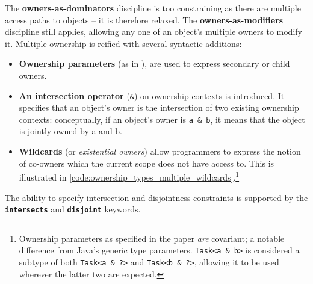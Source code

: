 \documentclass{acm_proc_article-sp}
\begin{document}
The \textbf{owners-as-dominators} discipline is too constraining as there are
multiple access paths to objects -- it is therefore relaxed. The
\textbf{owners-as-modifiers} discipline still applies, allowing any one
of an object's multiple owners to modify it. Multiple ownership is reified with
several syntactic additions:

\begin{itemize}

	\item \textbf{Ownership parameters} (as in \cite{boyapati04safejava}), are
		used to express secondary or child owners.

	\item \textbf{An intersection operator} (\lstinline|&|) on ownership
		contexts is introduced. It specifies that an object's owner is the
		intersection of two existing ownership contexts: conceptually, if an
		object's owner is \lstinline|a & b|, it means that the object is jointly
		owned by a and b.

	\item \textbf{Wildcards} (or \textit{existential owners}) allow programmers
		to express the notion of co-owners which the current scope does not
		have access to. This is illustrated in
		\cref{code:ownership_types_multiple_wildcards}.\footnote{Ownership
		parameters as specified in the paper \textit{are} covariant; a
		notable difference from Java's generic type parameters.\linebreak
		\lstinline|Task<a & b>| is considered a subtype of both
		\lstinline|Task<a & ?>| and \lstinline|Task<b & ?>|, allowing it to be
		used wherever the latter two are expected.}

		

\end{itemize}

The ability to specify intersection and disjointness constraints is supported
by the \textbf{\lstinline|intersects|} and \textbf{\lstinline|disjoint|}
keywords.
\end{document}
